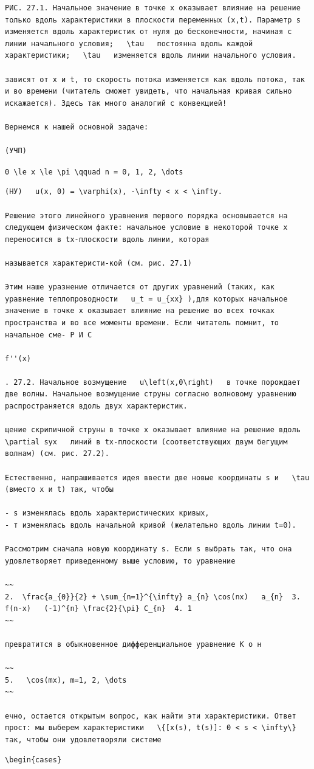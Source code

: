\documentclass[
  ukrainian,
]{article}
\begin{document}
\begin{verbatim}
РИС. 27.1. Начальное значение в точке x оказывает влияние на решение только вдоль характеристики в плоскости переменных (x,t). Параметр s изменяется вдоль характеристик от нуля до бесконечности, начиная с линии начального условия;   \tau   постоянна вдоль каждой характеристики;   \tau   изменяется вдоль линии начального условия.

зависят от x и t, то скорость потока изменяется как вдоль потока, так и во времени (читатель сможет увидеть, что начальная кривая сильно искажается). Здесь так много аналогий с конвекцией!

Вернемся к нашей основной задаче:

(УЧП)
\end{verbatim}

\texttt{0\ \textbackslash{}le\ x\ \textbackslash{}le\ \textbackslash{}pi\ \textbackslash{}qquad\ n\ =\ 0,\ 1,\ 2,\ \textbackslash{}dots}

\begin{verbatim}
(НУ)   u(x, 0) = \varphi(x), -\infty < x < \infty.

Решение этого линейного уравнения первого порядка основывается на следующем физическом факте: начальное условие в некоторой точке x переносится в tx-плоскости вдоль линии, которая

называется характеристи-кой (см. рис. 27.1)

Этим наше уразнение отличается от других уравнений (таких, как уравнение теплопроводности   u_t = u_{xx} ),для которых начальное значение в точке x оказывает влияние на решение во всех точках пространства и во все моменты времени. Если читатель помнит, то начальное сме- Р И С

f''(x)

. 27.2. Начальное возмущение   u\left(x,0\right)   в точке порождает две волны. Начальное возмущение струны согласно волновому уравнению распространяется вдоль двух характеристик.

щение скрипичной струны в точке x оказывает влияние на решение вдоль   \partial syx   линий в tx-плоскости (соответствующих двум бегущим волнам) (см. рис. 27.2).

Естественно, напрашивается идея ввести две новые координаты s и   \tau   (вместо x и t) так, чтобы

- s изменялась вдоль характеристических кривых,
- т изменялась вдоль начальной кривой (желательно вдоль линии t=0).

Рассмотрим сначала новую координату s. Если s выбрать так, что она удовлетворяет приведенному выше условию, то уравнение

~~
2.  \frac{a_{0}}{2} + \sum_{n=1}^{\infty} a_{n} \cos(nx)   a_{n}  3.  f(n-x)   (-1)^{n} \frac{2}{\pi} C_{n}  4. 1
~~

превратится в обыкновенное дифференциальное уравнение К о н

~~
5.   \cos(mx), m=1, 2, \dots 
~~

ечно, остается открытым вопрос, как найти эти характеристики. Ответ прост: мы выберем характеристики   \{[x(s), t(s)]: 0 < s < \infty\}   так, чтобы они удовлетворяли системе
\end{verbatim}

\begin{verbatim}
\begin{cases}
\end{verbatim}
\end{document}

